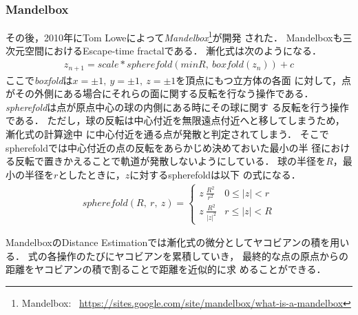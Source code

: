 \subsubsection{Mandelbox}

その後，2010年にTom Loweによって\textit{Mandelbox}\footnote{Mandelbox:
~\url{https://sites.google.com/site/mandelbox/what-is-a-mandelbox}}が開発
された．
Mandelboxも三次元空間におけるEscape-time fractalである．
漸化式は次のようになる．
\begin{align*}
 z_{n+1} = scale * spherefold(minR,~boxfold(z_n)) + c
\end{align*}
ここで\textit{boxfold}は$x=\pm1,~y=\pm1,~z=\pm1$を頂点にもつ立方体の各面
に対して，点がその外側にある場合にそれらの面に関する反転を行なう操作である．
\textit{spherefold}は点が原点中心の球の内側にある時にその球に関す
る反転を行う操作である．
ただし，球の反転は中心付近を無限遠点付近へと移してしまうため，漸化式の計算途中
に中心付近を通る点が発散と判定されてしまう．
そこでspherefoldでは中心付近の点の反転をあらかじめ決めておいた最小の半
径における反転で置きかえることで軌道が発散しないようにしている．
球の半径を$R$，最小の半径を$r$としたときに，$z$に対するspherefoldは以下
の式になる．
\begin{align*}
 spherefold(R,~r,~z) = \begin{cases}
                  z~\frac{R^2}{r^2} & 0 \le |z| < r \\
                  z~\frac{R^2}{|z|^2} & r \le |z| < R
                 \end{cases}
\end{align*}

MandelboxのDistance Estimationでは漸化式の微分としてヤコビアンの積を用いる．
式の各操作のたびにヤコビアンを累積していき，
最終的な点の原点からの距離をヤコビアンの積で割ることで距離を近似的に求
めることができる．

